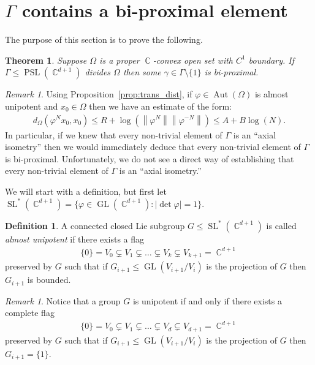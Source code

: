 \documentclass[12pt]{amsart}
\theoremstyle{plain}
\newtheorem{theorem}[proposition]{Theorem}
\theoremstyle{definition}
\newtheorem{definition}[proposition]{Definition}
\theoremstyle{remark}
\newtheorem{remark}[proposition]{Remark}
\begin{document}
\section{$\Gamma$ contains a bi-proximal element}\label{sec:exist_bi}

The purpose of this section is to prove the following.

\begin{theorem}
\label{thm:exist_bi}
Suppose $\Omega$ is a proper $\operatorname{\mathbb{C}}$-convex open set with $C^1$ boundary. If $\Gamma \leq \operatorname{PSL}(\operatorname{\mathbb{C}}^{d+1})$ divides $\Omega$ then some $\gamma \in \Gamma \setminus \{1\}$  is bi-proximal.
\end{theorem}

\begin{remark}
Using Proposition~\ref{prop:trans_dist}, if $\varphi \in \operatorname{Aut}(\Omega)$ is almost unipotent and $x_0 \in \Omega$ then we have an estimate of the form:
\begin{align}
\label{eq:abcd}
d_{\Omega}(\varphi^N x_0,x_0) \leq R + \log \left({\left\|{\varphi^N}\right\|}{\left\|{\varphi^{-N}}\right\|}\right) \leq A+B\log(N).
\end{align}
In particular, if we knew that every non-trivial element of $\Gamma$ is an ``axial isometry'' then we would immediately deduce that every non-trivial element of $\Gamma$ is bi-proximal. Unfortunately, we do not see a direct way of establishing that every non-trivial element of $\Gamma$ is an ``axial isometry.'' \end{remark}

We will start with a definition, but first let $\operatorname{SL}^*(\operatorname{\mathbb{C}}^{d+1}) = \{ \varphi \in \operatorname{GL}(\operatorname{\mathbb{C}}^{d+1}) : {\left|{\det \varphi }\right|}=1\}$.

\begin{definition}
A connected closed Lie subgroup $G \leq \operatorname{SL}^*(\operatorname{\mathbb{C}}^{d+1})$ is called \emph{almost unipotent} if there exists a flag 
\begin{align*}
\{0\} = V_0 \subsetneq V_1 \subsetneq  \dots \subsetneq V_k \subsetneq V_{k+1} = \operatorname{\mathbb{C}}^{d+1}
\end{align*}
preserved by $G$ such that if $G_{i+1} \leq \operatorname{GL}(V_{i+1}/V_i)$ is the projection of $G$ then $G_{i+1}$ is bounded. 
\end{definition} 

\begin{remark}
Notice that a group $G$ is unipotent if and only if there exists a complete flag 
\begin{align*}
\{0\} = V_0 \subsetneq V_1 \subsetneq  \dots \subsetneq V_{d} \subsetneq V_{d+1} = \operatorname{\mathbb{C}}^{d+1}
\end{align*}
preserved by $G$ such that if $G_{i+1} \leq \operatorname{GL}(V_{i+1}/V_i)$ is the projection of $G$ then $G_{i+1}=\{1\}$.
\end{remark}
\end{document}
